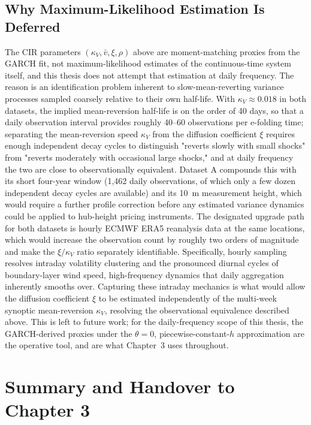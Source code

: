 \subsection{Why Maximum-Likelihood Estimation Is Deferred}
\label{sec:phase5-mle}

The CIR parameters $(\kappa_V, \bar v, \xi, \rho)$ above are moment-matching proxies from the GARCH fit, not maximum-likelihood estimates of the continuous-time system itself, and this thesis does not attempt that estimation at daily frequency. The reason is an identification problem inherent to slow-mean-reverting variance processes sampled coarsely relative to their own half-life. With $\kappa_V \approx 0.018$ in both datasets, the implied mean-reversion half-life is on the order of 40 days, so that a daily observation interval provides roughly 40--60 observations per e-folding time; separating the mean-reversion speed $\kappa_V$ from the diffusion coefficient $\xi$ requires enough independent decay cycles to distinguish "reverts slowly with small shocks" from "reverts moderately with occasional large shocks," and at daily frequency the two are close to observationally equivalent. Dataset A compounds this with its short four-year window (1,462 daily observations, of which only a few dozen independent decay cycles are available) and its 10~m measurement height, which would require a further profile correction before any estimated variance dynamics could be applied to hub-height pricing instruments. The designated upgrade path for both datasets is hourly ECMWF ERA5 reanalysis data at the same locations, which would increase the observation count by roughly two orders of magnitude and make the $\xi/\kappa_V$ ratio separately identifiable. Specifically, hourly sampling resolves intraday volatility clustering and the pronounced diurnal cycles of boundary-layer wind speed, high-frequency dynamics that daily aggregation inherently smooths over. Capturing these intraday mechanics is what would allow the diffusion coefficient $\xi$ to be estimated independently of the multi-week synoptic mean-reversion $\kappa_V$, resolving the observational equivalence described above. This is left to future work; for the daily-frequency scope of this thesis, the GARCH-derived proxies under the $\theta=0$, piecewise-constant-$h$ approximation are the operative tool, and are what Chapter~3 uses throughout.

\section{Summary and Handover to Chapter 3}
\label{sec:phase-summary}

